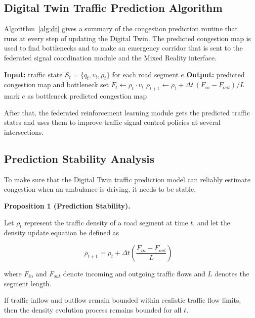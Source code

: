 \documentclass[conference]{IEEEtran}
\begin{document}
\subsection{Digital Twin Traffic Prediction Algorithm}
Algorithm~\ref{alg:dt} gives a summary of the congestion prediction routine that runs at every step of updating the Digital Twin. The predicted congestion map is used to find bottlenecks and to make an emergency corridor that is sent to the federated signal coordination module and the Mixed Reality interface.

\begin{algorithm}[t]
\caption{Digital Twin Congestion Prediction}
\label{alg:dt}
\begin{algorithmic}[1]
\Statex \textbf{Input:} traffic state $S_t=\{q_t, v_t, \rho_t\}$ for each road segment $e$
\Statex \textbf{Output:} predicted congestion map and bottleneck set
  \State $F_t \gets \rho_t \cdot v_t$
  \State $\rho_{t+1} \gets \rho_t + \Delta t\, (F_{in} - F_{out}) / L$
    \State mark $e$ as bottleneck
  \EndIf
\EndFor
\State \Return predicted congestion map
\end{algorithmic}
\end{algorithm}

After that, the federated reinforcement learning module gets the predicted traffic states and uses them to improve traffic signal control policies at several intersections.

\subsection*{Prediction Stability Analysis}

To make sure that the Digital Twin traffic prediction model can reliably estimate congestion when an ambulance is driving, it needs to be stable.

\textbf{Proposition 1 (Prediction Stability).}

Let $\rho_t$ represent the traffic density of a road segment at time $t$, and let the density update equation be defined as

\[
\rho_{t+1} = \rho_t + \Delta t \left(\frac{F_{in}-F_{out}}{L}\right)
\]

where $F_{in}$ and $F_{out}$ denote incoming and outgoing traffic flows and $L$ denotes the segment length.

If traffic inflow and outflow remain bounded within realistic traffic flow limits, then the density evolution process remains bounded for all $t$.
\end{document}
